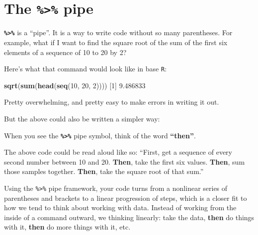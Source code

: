 \documentclass[
]{book}
\newenvironment{Shaded}{\begin{snugshade}}{\end{snugshade}}
\newcommand{\DecValTok}[1]{\textcolor[rgb]{0.00,0.00,0.81}{#1}}
\newcommand{\FloatTok}[1]{\textcolor[rgb]{0.00,0.00,0.81}{#1}}
\newcommand{\KeywordTok}[1]{\textcolor[rgb]{0.13,0.29,0.53}{\textbf{#1}}}
\newcommand{\NormalTok}[1]{#1}
\newcommand{\OperatorTok}[1]{\textcolor[rgb]{0.81,0.36,0.00}{\textbf{#1}}}
\newcommand{\StringTok}[1]{\textcolor[rgb]{0.31,0.60,0.02}{#1}}
\begin{document}
\hypertarget{the-pipe}{%
\section*{\texorpdfstring{The \texttt{\%\textgreater{}\%} pipe}{The \%\textgreater\% pipe}}\label{the-pipe}}

\textbf{\texttt{\%\textgreater{}\%}} is a ``pipe''. It is a way to write code without so many parentheses. For example, what if I want to find the square root of the sum of the first six elements of a sequence of 10 to 20 by 2?

Here's what that command would look like in base \texttt{R}:

\begin{Shaded}
\begin{Highlighting}[]
\KeywordTok{sqrt}\NormalTok{(}\KeywordTok{sum}\NormalTok{(}\KeywordTok{head}\NormalTok{(}\KeywordTok{seq}\NormalTok{(}\DecValTok{10}\NormalTok{, }\DecValTok{20}\NormalTok{, }\DecValTok{2}\NormalTok{))))}
\NormalTok{[}\DecValTok{1}\NormalTok{] }\FloatTok{9.486833}
\end{Highlighting}
\end{Shaded}

Pretty overwhelming, and pretty easy to make errors in writing it out.

But the above could also be written a simpler way:

\begin{Shaded}
\end{Shaded}

When you see the \textbf{\texttt{\%\textgreater{}\%}} pipe symbol, think of the word \textbf{``then''}.

The above code could be read aloud like so: ``First, get a sequence of every second number between 10 and 20. \textbf{Then}, take the first six values. \textbf{Then}, sum those samples together. \textbf{Then}, take the square root of that sum.''

Using the \texttt{\%\textgreater{}\%} pipe framework, your code turns from a nonlinear series of parentheses and brackets to a linear progression of steps, which is a closer fit to how we tend to think about working with data. Instead of working from the inside of a command outward, we thinking linearly: take the data, \textbf{then} do things with it, \textbf{then} do more things with it, etc.
\end{document}

